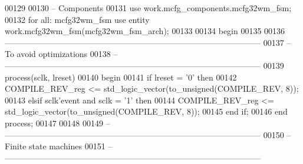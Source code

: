 \begin{DoxyCode}
00129     
00130 \textcolor{keyword}{    -- Components}
00131 \textcolor{vhdlkeyword}{    use }work.mcfg_components.mcfg32wm\_fsm;
00132     \textcolor{keywordflow}{for} \textcolor{keywordflow}{all}\textcolor{vhdlchar}{:} \textcolor{vhdlchar}{mcfg32wm\_fsm} \textcolor{keywordflow}{use} \textcolor{keywordflow}{entity} \textcolor{vhdlchar}{work}\textcolor{vhdlchar}{.}\textcolor{vhdlchar}{mcfg32wm\_fsm}\textcolor{vhdlchar}{(}\textcolor{vhdlchar}{mcfg32wm\_fsm\_arch}\textcolor{vhdlchar}{)};
00133 
00134 \textcolor{vhdlkeyword}{begin}
00135 
00136 \textcolor{keyword}{   ---------------------------------------------------------------------------------------------}
00137 \textcolor{keyword}{    -- To avoid optimizations}
00138 \textcolor{keyword}{    -- ---------------------------------------------------------------------------------------------}
00139     \textcolor{keywordflow}{process}(sclk, lreset)
00140 \textcolor{vhdlkeyword}{    begin}
00141         \textcolor{keywordflow}{if} \textcolor{vhdlchar}{lreset} \textcolor{vhdlchar}{=} \textcolor{vhdlchar}{'}\textcolor{vhdllogic}{}\textcolor{vhdllogic}{0}\textcolor{vhdlchar}{'} \textcolor{keywordflow}{then}
00142             \textcolor{vhdlchar}{COMPILE_REV_reg} \textcolor{vhdlchar}{<=} \textcolor{comment}{std\_logic\_vector}\textcolor{vhdlchar}{(}\textcolor{vhdlchar}{to\_unsigned}\textcolor{vhdlchar}{(}\textcolor{vhdlchar}{COMPILE_REV}\textcolor{vhdlchar}{,} \textcolor{vhdllogic}{}\textcolor{vhdllogic}{8}\textcolor{vhdlchar}{)}\textcolor{vhdlchar}{)};
00143         \textcolor{keywordflow}{elsif} \textcolor{vhdlchar}{sclk}\textcolor{vhdlchar}{'}\textcolor{vhdlkeyword}{event} \textcolor{keywordflow}{and} \textcolor{vhdlchar}{sclk} \textcolor{vhdlchar}{=} \textcolor{vhdlchar}{'}\textcolor{vhdllogic}{}\textcolor{vhdllogic}{1}\textcolor{vhdlchar}{'} \textcolor{keywordflow}{then}
00144          \textcolor{vhdlchar}{COMPILE_REV_reg} \textcolor{vhdlchar}{<=} \textcolor{comment}{std\_logic\_vector}\textcolor{vhdlchar}{(}\textcolor{vhdlchar}{to\_unsigned}\textcolor{vhdlchar}{(}\textcolor{vhdlchar}{COMPILE_REV}\textcolor{vhdlchar}{,} \textcolor{vhdllogic}{}\textcolor{vhdllogic}{8}\textcolor{vhdlchar}{)}\textcolor{vhdlchar}{)};
00145         \textcolor{keywordflow}{end} \textcolor{keywordflow}{if};
00146     \textcolor{keywordflow}{end} \textcolor{keywordflow}{process};
00147 
00148 
00149 \textcolor{keyword}{    -- ---------------------------------------------------------------------------------------------}
00150 \textcolor{keyword}{    -- Finite state machines}
00151 \textcolor{keyword}{    -- ---------------------------------------------------------------------------------------------}

\end{DoxyCode}
